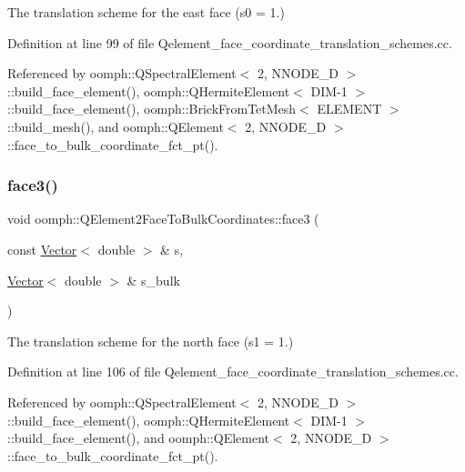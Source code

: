 The translation scheme for the east face (s0 = 1.) 



Definition at line 99 of file Qelement\+\_\+face\+\_\+coordinate\+\_\+translation\+\_\+schemes.\+cc.



Referenced by oomph\+::\+Q\+Spectral\+Element$<$ 2, N\+N\+O\+D\+E\+\_\+D $>$\+::build\+\_\+face\+\_\+element(), oomph\+::\+Q\+Hermite\+Element$<$ D\+I\+M-\/1 $>$\+::build\+\_\+face\+\_\+element(), oomph\+::\+Brick\+From\+Tet\+Mesh$<$ E\+L\+E\+M\+E\+N\+T $>$\+::build\+\_\+mesh(), and oomph\+::\+Q\+Element$<$ 2, N\+N\+O\+D\+E\+\_\+D $>$\+::face\+\_\+to\+\_\+bulk\+\_\+coordinate\+\_\+fct\+\_\+pt().

\mbox{\label{namespaceoomph_1_1QElement2FaceToBulkCoordinates_af032c8455c159191a98f1b3b64212b9a}} 
\subsubsection{\texorpdfstring{face3()}{face3()}}
{\footnotesize\ttfamily void oomph\+::\+Q\+Element2\+Face\+To\+Bulk\+Coordinates\+::face3 (\begin{DoxyParamCaption}\item[{const \hyperlink{classoomph_1_1Vector}{Vector}$<$ double $>$ \&}]{s,  }\item[{\hyperlink{classoomph_1_1Vector}{Vector}$<$ double $>$ \&}]{s\+\_\+bulk }\end{DoxyParamCaption})}



The translation scheme for the north face (s1 = 1.) 



Definition at line 106 of file Qelement\+\_\+face\+\_\+coordinate\+\_\+translation\+\_\+schemes.\+cc.



Referenced by oomph\+::\+Q\+Spectral\+Element$<$ 2, N\+N\+O\+D\+E\+\_\+D $>$\+::build\+\_\+face\+\_\+element(), oomph\+::\+Q\+Hermite\+Element$<$ D\+I\+M-\/1 $>$\+::build\+\_\+face\+\_\+element(), and oomph\+::\+Q\+Element$<$ 2, N\+N\+O\+D\+E\+\_\+D $>$\+::face\+\_\+to\+\_\+bulk\+\_\+coordinate\+\_\+fct\+\_\+pt().

